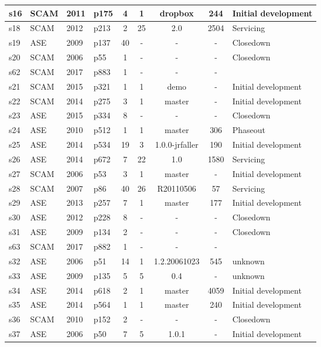 \begin{longtable}{| l | l | l | l | c | c | c | c | l |}
    \hline
s16 & SCAM & 2011 & p175 & 4 & 1 & dropbox & 244 & Initial development \\
    \hline
s18 & SCAM & 2012 & p213 & 2 & 25 & 2.0 & 2504 & Servicing \\
    \hline
s19 & ASE & 2009 & p137 & 40 & - & - & - & Closedown \\
    \hline
s20 & SCAM & 2006 & p55 & 1 & - & - & - & Closedown \\
    \hline
s62 & SCAM & 2017 & p883 & 1 & - & - & - &  \\
    \hline
s21 & SCAM & 2015 & p321 & 1 & 1 & demo & - & Initial development \\
    \hline
s22 & SCAM & 2014 & p275 & 3 & 1 & master & - & Initial development \\
    \hline
s23 & ASE & 2015 & p334 & 8 & - & - & - & Closedown \\
    \hline
s24 & ASE & 2010 & p512 & 1 & 1 & master & 306 & Phaseout \\
    \hline
s25 & ASE & 2014 & p534 & 19 & 3 & 1.0.0-jrfaller & 190 & Initial development \\
    \hline
s26 & ASE & 2014 & p672 & 7 & 22 & 1.0 & 1580 & Servicing \\
    \hline
s27 & SCAM & 2006 & p53 & 3 & 1 & master & - & Initial development \\
    \hline
s28 & SCAM & 2007 & p86 & 40 & 26 & R20110506 & 57 & Servicing \\
    \hline
s29 & ASE & 2013 & p257 & 7 & 1 & master & 177 & Initial development \\
    \hline
s30 & ASE & 2012 & p228 & 8 & - & - & - & Closedown \\
    \hline
s31 & ASE & 2009 & p134 & 2 & - & - & - & Closedown \\
    \hline
s63 & SCAM & 2017 & p882 & 1 & - & - & - &  \\
    \hline
s32 & ASE & 2006 & p51 & 14 & 1 & 1.2.20061023 & 545 & unknown \\
    \hline
s33 & ASE & 2009 & p135 & 5 & 5 & 0.4 & - & unknown \\
    \hline
s34 & ASE & 2014 & p618 & 2 & 1 & master & 4059 & Initial development \\
    \hline
s35 & ASE & 2014 & p564 & 1 & 1 & master & 240 & Initial development \\
    \hline
s36 & SCAM & 2010 & p152 & 2 & - & - & - & Closedown \\
    \hline
s37 & ASE & 2006 & p50 & 7 & 5 & 1.0.1 & - & Initial development \\

\end{longtable}
